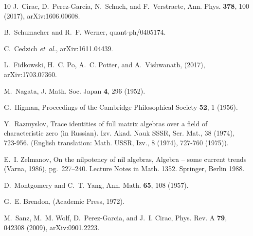 \documentclass[pra,twocolumn,nofootinbib,superscriptaddress]{revtex4-1}
\begin{document}
\begin{thebibliography}{10}
	J.~Cirac, D.~Perez-Garcia, N.~Schuch, and F.~Verstraete,
	\newblock Ann. Phys. {\bf 378}, 100 (2017), arXiv:1606.00608.

	B.~Schumacher and R.~F. Werner,
	\newblock quant-ph/0405174.

	C.~Cedzich {\em et~al.},
	\newblock arXiv:1611.04439.

	L.~Fidkowski, H.~C. Po, A.~C. Potter, and A.~Vishwanath,
	\newblock (2017), arXiv:1703.07360.

	M.~Nagata,
	\newblock J. Math. Soc. Japan {\bf 4}, 296 (1952).

	G.~Higman,
	\newblock Proceedings of the Cambridge Philosophical Society {\bf 52}, 1
	(1956).

	Y.~Razmyslov,
	\newblock Trace identities of full matrix algebras over a field of
	characteristic zero (in Russian). Izv. Akad. Nauk SSSR, Ser. Mat., 38 (1974),
	723-956. (English translation: Math. USSR, Izv., 8 (1974), 727-760 (1975)).

	E.~I. Zelmanov,
	\newblock On the nilpotency of nil algebras, Algebra -- some current trends
	(Varna, 1986), pg.~227--240. Lecture Notes in Math. 1352. Springer, Berlin
	1988.

	D.~Montgomery and C.~T. Yang,
	\newblock Ann. Math. {\bf 65}, 108 (1957).

	G.~E. Brendon,
	 (Academic Press,
	1972).

	M.~Sanz, M.~M. Wolf, D.~Perez-Garcia, and J.~I. Cirac,
	\newblock Phys. Rev. A {\bf 79}, 042308 (2009), arXiv:0901.2223.

\end{thebibliography}
\end{document}
